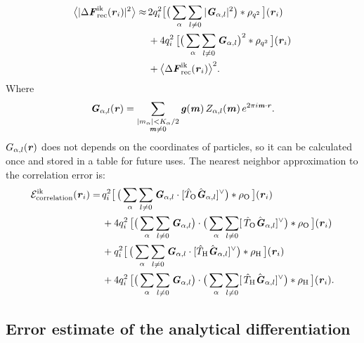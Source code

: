 \documentclass[aps,pre,preprint]{revtex4}
\renewcommand{\v}[1]{\textbf{\textit{#1}}}
\begin{document}
\begin{align}\nonumber
  \big\langle
  \vert\Delta\v F_{\textrm{rec}}^{\textrm{ik}}(\v r_i)\vert^2
  \big\rangle
  \approx&\, 
  2q_i^2
  \big[
  \big(
  \sum_{\alpha} \sum_{l\neq 0}
  \vert \v G_{\alpha,l}\vert^2
  \big)
  \ast \rho_{q^2}
  \,\big] (\v r_i)\\\nonumber
  &\,+
  4q_i^2\,
  \big[
  \big(
  \sum_{\alpha} \sum_{l\neq 0}  
  \v G_{\alpha,l}
  \big)^2
  \ast \rho_{q^2}\,
  \big] (\v r_i) \\\label{eqn:ik.error}
  &\,+
  \big\langle
  \Delta\v F_{\textrm{rec}}^{\textrm{ik}}(\v r_i)
  \big\rangle^2.
\end{align}
Where
\begin{align}
  \v G_{\alpha,l}(\v r) =
  \sum_{
    \begin{subarray}{c}
      \vert m_{\alpha}\vert < K_\alpha/2\\
      \v m\neq 0
    \end{subarray}}
  \v g(\v m)\,
  Z_{\alpha,l}(\v m)\,
  e^{2\pi i\v m\cdot\v r}.
\end{align}
$G_{\alpha,l}(\v r)$ does not depends on the coordinates of particles,
so it can be calculated once and stored in a table for future uses.
The nearest neighbor approximation to the correlation error is:
\begin{align}\nonumber
  \mathcal E^{\textrm{ik}}_{\textrm{correlation}}(\v r_i)
  =\,&
  q_i^2
  \big[\,
  \big(
  \sum_{\alpha} \sum_{l\neq 0}
  \v G_{\alpha,l}\cdot[\hat T_{\textrm{O}}\hat{\v G}_{\alpha,l}]^{\vee}
  \big)
  \ast \rho_{\textrm{O}}
  \,\big] (\v r_i) \\\nonumber
  \,&+
  4q_i^2\,
  \big[
  \big(
  \sum_{\alpha} \sum_{l\neq 0}  
  \v G_{\alpha,l}
  \big)
  \cdot
  \big(
  \sum_{\alpha} \sum_{l\neq 0}  
  [\,\hat T_{\textrm{O}}\hat{\v G}_{\alpha,l}]^{\vee}
  \big)
  \ast \rho_{\textrm{O}}\,
  \big] (\v r_i) \\\nonumber
  \,&+
  q_i^2
  \big[\,
  \big(
  \sum_{\alpha} \sum_{l\neq 0}
  \v G_{\alpha,l}\cdot[\hat T_{\textrm{H}}\hat{\v G}_{\alpha,l}]^{\vee}
  \big)
  \ast \rho_{\textrm{H}}
  \,\big] (\v r_i) \\
  \,&+
  4q_i^2\,
  \big[
  \big(
  \sum_{\alpha} \sum_{l\neq 0}  
  \v G_{\alpha,l}
  \big)
  \cdot
  \big(
  \sum_{\alpha} \sum_{l\neq 0}  
  [\,\hat T_{\textrm{H}}\hat{\v G}_{\alpha,l}]^{\vee}
  \big)
  \ast \rho_{\textrm{H}}\,
  \big] (\v r_i).
\end{align}


\subsection{Error estimate of the analytical differentiation}
\label{sec:error-ana}
\end{document}
